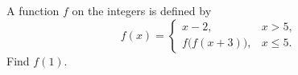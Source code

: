 A function $f$ on the integers is defined by
\[
f(x)=\begin{cases}x-2,& x>5,\\ f\bigl(f(x+3)\bigr),& x\le5.\end{cases}
\]
Find $f(1)$.
